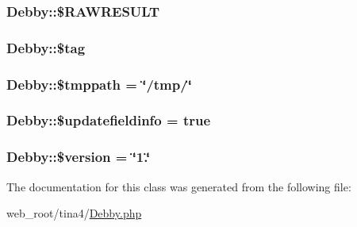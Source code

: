 \subsubsection[{\$\+R\+A\+W\+R\+E\+S\+U\+L\+T}]{\setlength{\rightskip}{0pt plus 5cm}Debby\+::\$\+R\+A\+W\+R\+E\+S\+U\+L\+T}\label{classDebby_a462ad03fefee05b5f763469f8bb5abfc}
\hypertarget{classDebby_aaa503bfd657eddafff230f0d49da7cb1}{}
\subsubsection[{\$tag}]{\setlength{\rightskip}{0pt plus 5cm}Debby\+::\$tag}\label{classDebby_aaa503bfd657eddafff230f0d49da7cb1}
\hypertarget{classDebby_afffc183cbae8307150a838bf3a053ca8}{}
\subsubsection[{\$tmppath}]{\setlength{\rightskip}{0pt plus 5cm}Debby\+::\$tmppath = \char`\"{}/tmp/\char`\"{}}\label{classDebby_afffc183cbae8307150a838bf3a053ca8}
\hypertarget{classDebby_a3e7f1fb2178543ff80e0ce7e7b85e528}{}
\subsubsection[{\$updatefieldinfo}]{\setlength{\rightskip}{0pt plus 5cm}Debby\+::\$updatefieldinfo = true}\label{classDebby_a3e7f1fb2178543ff80e0ce7e7b85e528}
\hypertarget{classDebby_a378b706b515617c9019b313136e4678c}{}
\subsubsection[{\$version}]{\setlength{\rightskip}{0pt plus 5cm}Debby\+::\$version = \char`\"{}1.\char`\"{}}\label{classDebby_a378b706b515617c9019b313136e4678c}


The documentation for this class was generated from the following file\+:\begin{DoxyCompactItemize}
\item 
web\+\_\+root/tina4/\hyperlink{Debby_8php}{Debby.\+php}\end{DoxyCompactItemize}
